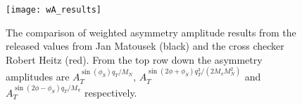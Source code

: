 \begin{figure}[h!t]
  \centering \texttt{[image: wA\_results]}
  \caption{The comparison of weighted asymmetry amplitude results from the
    released values from Jan Matousek (black) and the cross checker Robert Heitz
    (red).  From the top row down the asymmetry amplitudes are
    $A_T^{\sin(\phi_S) q_T/M_N}$, $A_T^{\sin(2\phi+\phi_S)
      q^3_T/(2M_{\pi}M_N^2)}$ and $A_T^{\sin(2\phi-\phi_S) q_T/M_{\pi}}$
    respectively.}
  \label{fig::wA_results}
\end{figure}


